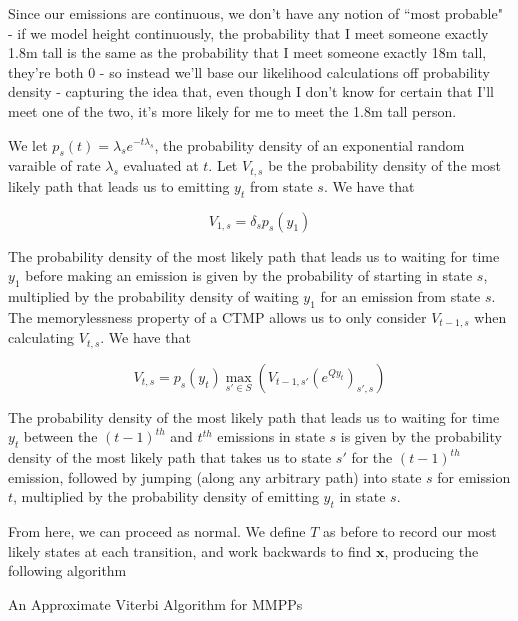 Since our emissions are continuous, we don't have any notion of ``most probable" - if we model height continuously, the probability that I meet someone exactly 1.8m tall is the same as the probability that I meet someone exactly 18m tall, they're both 0 - so instead we'll base our likelihood calculations off probability density - capturing the idea that, even though I don't know for certain that I'll meet one of the two, it's more likely for me to meet the 1.8m tall person.

We let $p_s(t)= \lambda_s e^{-t\lambda_s}$, the probability density of an exponential random varaible of rate $\lambda_s$ evaluated at $t$. Let $V_{t,s}$ be the probability density of the most likely path that leads us to emitting $y_t$ from state $s$. We have that

$$
V_{1,s} =  \delta_{s}p_s(y_1)
$$

The probability density of the most likely path that leads us to waiting for time $y_1$ before making an emission is given by the probability of starting in state $s$, multiplied by the probability density of waiting $y_1$ for an emission from state $s$. The memorylessness property of a CTMP allows us to only consider $V_{t-1,s}$ when calculating $V_{t,s}$. We have that

$$
V_{t,s} = p_s(y_t) \max_{s'\in S} (V_{t-1,s'}(e^{Qy_t})_{s',s})
$$

The probability density of the most likely path that leads us to waiting for time $y_t$ between the $(t-1)^{th}$ and $t^{th}$ emissions in state $s$ is given by the probability density of the most likely path that takes us to state $s'$ for the $(t-1)^{th}$ emission, followed by jumping (along any arbitrary path) into state $s$ for emission $t$, multiplied by the probability density of emitting $y_t$ in state $s$.

From here, we can proceed as normal. We define $T$ as before to record our most likely states at each transition, and work backwards to find $\mathbf{x}$, producing the following algorithm

\begin{algorithm}
\SetAlgoLined
{}

\caption{An Approximate Viterbi Algorithm for MMPPs}

\end{algorithm}

